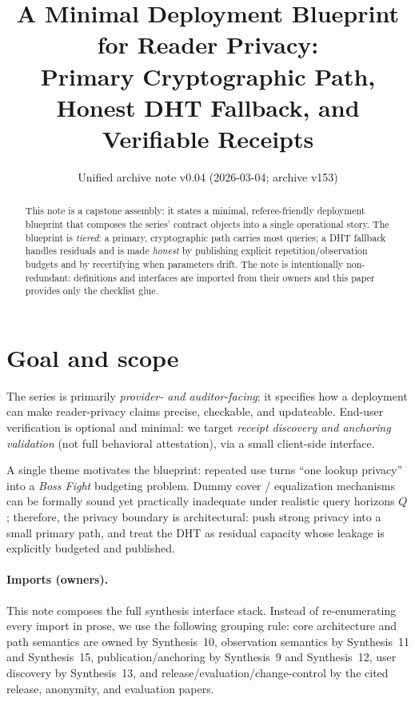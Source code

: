 \documentclass[11pt]{article}
\title{A Minimal Deployment Blueprint for Reader Privacy:\\ Primary Cryptographic Path, Honest DHT Fallback, and Verifiable Receipts}
\author{}
\date{Unified archive note v0.04 (2026-03-04; archive v153)}
\begin{document}
\maketitle

\begin{abstract}
This note is a capstone assembly: it states a minimal, referee-friendly deployment blueprint that composes the series' contract objects into a single operational story.
The blueprint is \emph{tiered}: a primary, cryptographic path carries most queries; a DHT fallback handles residuals and is made \emph{honest} by publishing explicit repetition/observation budgets and by recertifying when parameters drift.
The note is intentionally non-redundant: definitions and interfaces are imported from their owners and this paper provides only the checklist glue.
\end{abstract}

\section{Goal and scope}

The series is primarily \emph{provider- and auditor-facing}: it specifies how a deployment can make reader-privacy claims precise, checkable, and updateable.
End-user verification is optional and minimal: we target \emph{receipt discovery and anchoring validation} (not full behavioral attestation), via a small client-side interface.

A single theme motivates the blueprint: repeated use turns ``one lookup privacy'' into a \emph{Boss Fight} budgeting problem.
Dummy cover / equalization mechanisms can be formally sound yet practically inadequate under realistic query horizons $Q$; therefore, the privacy boundary is architectural:
push strong privacy into a small primary path, and treat the DHT as residual capacity whose leakage is explicitly budgeted and published.

\paragraph{Imports (owners).}
This note composes the full synthesis interface stack.
Instead of re-enumerating every import in prose, we use the following grouping rule:
core architecture and path semantics are owned by Synthesis~10, observation semantics by Synthesis~11 and Synthesis~15, publication/anchoring by Synthesis~9 and Synthesis~12, user discovery by Synthesis~13, and release/evaluation/change-control by the cited release, anonymity, and evaluation papers.\cite{series:contractobjects,series:threatwindows,series:transparency,series:receiptitems,series:tieredpattern,series:obsatten,series:selectiontax,series:tieredobsvec,series:releaseledger,series:abomoinl,series:evalnotary,series:advantagecontracts,series:bossfightdial}
\end{document}

